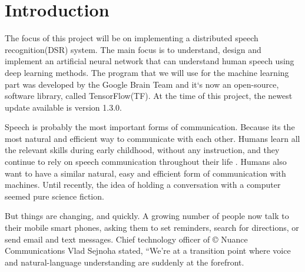 \chapter{Introduction}\label{ch:introduction}

The focus of this project will be on implementing a distributed speech recognition(DSR) system.
 The main focus is to understand, design and implement an artificial neural network that can understand human speech using deep learning methods. 
 The program that we will use for the machine learning part was developed by the Google Brain Team and it`s now an open-source, software library, called TensorFlow(TF). 
 At the time of this project, the newest update available is version 1.3.0. \cite{tensorflow2015-whitepaper-}

Speech is probably the most important forms of communication. Because its the most natural and efficient way to communicate with each other. Humans learn all the relevant skills during early childhood, without any instruction, and they continue to rely on speech communication throughout their life \cite{kamblespeech}. Humans also want to have a similar natural, easy and efficient form of communication with machines. Until recently, the idea of holding a conversation with a computer seemed pure science fiction.

But things are changing, and quickly. A growing number of people now talk to their mobile smart phones, asking them to set reminders, search for directions, or send email and text messages. Chief technology officer of \copyright{} Nuance Communications Vlad Sejnoha stated, “We’re at a transition point where voice and natural-language understanding are suddenly at the forefront.




\cite{kamblespeech}
 






